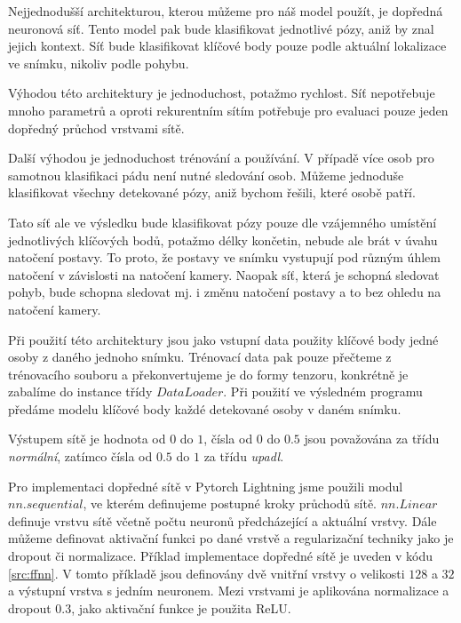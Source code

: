 Nejjednodušší architekturou, kterou můžeme pro náš model použít, je dopředná
neuronová síť. Tento model pak bude klasifikovat jednotlivé pózy, aniž by znal
jejich kontext. Síť bude klasifikovat klíčové body pouze podle aktuální
lokalizace ve snímku, nikoliv podle pohybu.

Výhodou této architektury je jednoduchost, potažmo rychlost. Síť nepotřebuje
mnoho parametrů a oproti rekurentním sítím potřebuje pro evaluaci pouze jeden
dopředný průchod vrstvami sítě.

Další výhodou je jednoduchost trénování a používání. V případě více osob pro
samotnou klasifikaci pádu není nutné sledování osob. Můžeme jednoduše
klasifikovat všechny detekované pózy, aniž bychom řešili, které osobě patří.

Tato síť ale ve výsledku bude klasifikovat pózy pouze dle vzájemného umístění
jednotlivých klíčových bodů, potažmo délky končetin, nebude ale brát v úvahu
natočení postavy. To proto, že postavy ve snímku vystupují pod různým úhlem
natočení v závislosti na natočení kamery. Naopak síť, která je schopná sledovat
pohyb, bude schopna sledovat mj. i změnu natočení postavy a to bez ohledu na
natočení kamery.

Při použití této architektury jsou jako vstupní data použity klíčové body jedné
osoby z daného jednoho snímku. Trénovací data pak pouze přečteme z trénovacího
souboru a překonvertujeme je do formy tenzoru, konkrétně je zabalíme do
instance třídy $DataLoader$. Při použití ve výsledném programu předáme modelu
klíčové body každé detekované osoby v daném snímku.

Výstupem sítě je hodnota od $0$ do $1$, čísla od $0$ do $0.5$ jsou považována
za třídu \textit{normální}, zatímco čísla od $0.5$ do $1$ za třídu
\textit{upadl}.

Pro implementaci dopředné sítě v Pytorch Lightning jsme použili modul
$nn.sequential$, ve kterém definujeme postupné kroky průchodů sítě. $nn.Linear$
definuje vrstvu sítě včetně počtu neuronů předcházející a aktuální vrstvy. Dále
můžeme definovat aktivační funkci po dané vrstvě a regularizační techniky jako
je dropout či normalizace. Příklad implementace dopředné sítě je uveden v kódu
\ref{src:ffnn}. V tomto příkladě jsou definovány dvě vnitřní vrstvy o velikosti
$128$ a $32$ a výstupní vrstva s jedním neuronem. Mezi vrstvami je aplikována
normalizace a dropout $0.3$, jako aktivační funkce je použita ReLU.

